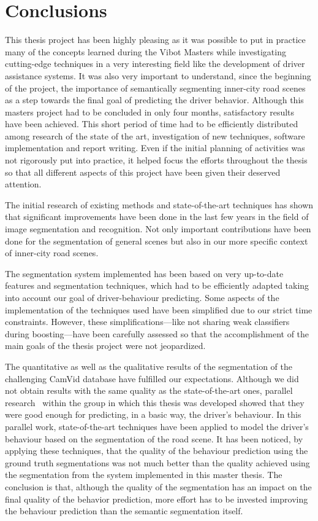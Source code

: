 \chapter{Conclusions} \label{chap:conclusions}

This thesis project has been highly pleasing as it was possible to put in practice many of the concepts learned during the Vibot Masters while investigating cutting-edge techniques in a very interesting field like the development of driver assistance systems. It was also very important to understand, since the beginning of the project, the importance of semantically segmenting inner-city road scenes as a step towards the final goal of predicting the driver behavior. Although this masters project had to be concluded in only four months, satisfactory results have been achieved. This short period of time had to be efficiently distributed among research of the state of the art, investigation of new techniques, software implementation and report writing. Even if the initial planning of activities was not rigorously put into practice, it helped focus the efforts throughout the thesis so that all different aspects of this project have been given their deserved attention.

The initial research of existing methods and state-of-the-art techniques has shown that significant improvements have been done in the last few years in the field of image segmentation and recognition. Not only important contributions have been done for the segmentation of general scenes but also in our more specific context of inner-city road scenes.

The segmentation system implemented has been based on very up-to-date features and segmentation techniques, which had to be efficiently adapted taking into account our goal of driver-behaviour predicting. Some aspects of the implementation of the techniques used have been simplified due to our strict time constraints. However, these simplifications---like not sharing weak classifiers during boosting---have been carefully assessed so that the accomplishment of the main goals of the thesis project were not jeopardized.

The quantitative as well as the qualitative results of the segmentation of the challenging CamVid database have fulfilled our expectations. Although we did not obtain results with the same quality as the state-of-the-art ones, parallel research~\cite{heracles:behavior} within the group in which this thesis was developed showed that they were good enough for predicting, in a basic way, the driver's behaviour. In this parallel work, state-of-the-art techniques have been applied to model the driver's behaviour based on the segmentation of the road scene. It has been noticed, by applying these techniques, that the quality of the behaviour prediction using the ground truth segmentations was not much better than the quality achieved using the segmentation from the system implemented in this master thesis. The conclusion is that, although the quality of the segmentation has an impact on the final quality of the behavior prediction, more effort has to be invested improving the behaviour prediction than the semantic segmentation itself.

